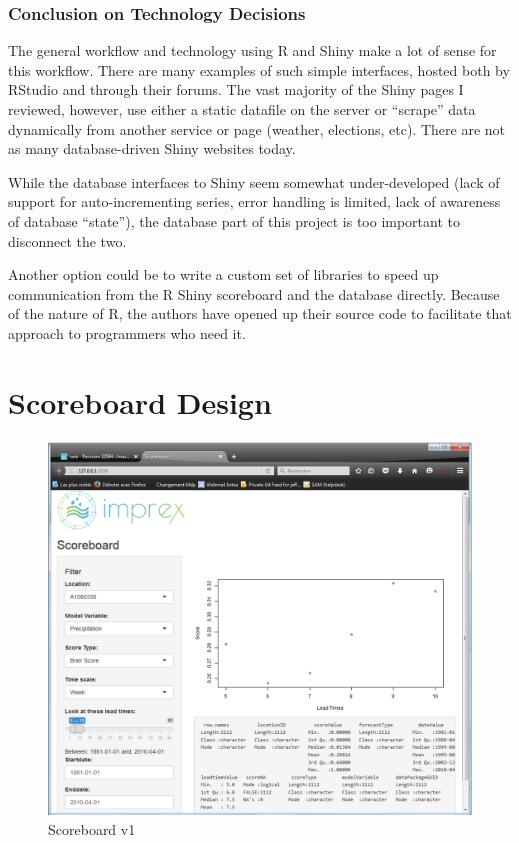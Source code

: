 \documentclass[logos,parttoc,morelanguage=french,morelanguage=german,draft]{orsay-memoire}
\begin{document}
\section{Conclusion on Technology Decisions}
The general workflow and technology using R and Shiny make a lot of sense for this workflow. There are many examples of such simple interfaces, hosted both by RStudio and through their forums. The vast majority of the Shiny pages I reviewed, however, use either a static datafile on the server or ``scrape'' data dynamically from another service or page (weather, elections, etc). There are not as many database-driven Shiny websites today.

While the database interfaces to Shiny seem somewhat under-developed (lack of support for auto-incrementing series, error handling is limited, lack of awareness of database ``state''), the database part of this project is too important to disconnect the two.

Another option could be to write a custom set of libraries to speed up communication from the R Shiny scoreboard and the database directly. Because of the nature of R, the authors have opened up their source code to facilitate that approach to programmers who need it.


\part{Scoreboard Design}

\begin{figure}[ht]
\centering
\includegraphics[width=0.8\linewidth]{images/sbdV1v21notes.png}
  \caption{Scoreboard v1}
  \label{fig:scoreboard v1}
\end{figure}
\end{document}
